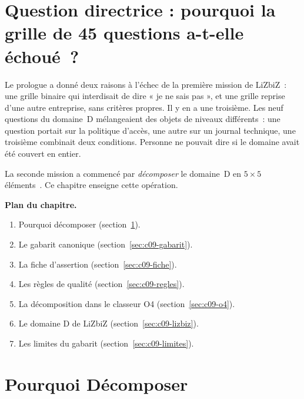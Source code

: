 \bigskip

\section*{Question directrice : pourquoi la grille de 45 questions a-t-elle échoué~?}

Le prologue a donné deux raisons à l'échec de la première mission de
LiZbiZ~: une grille binaire qui interdisait de dire « je ne sais pas », et
une grille reprise d'une autre entreprise, sans critères propres. Il y en a
une troisième. Les neuf questions du domaine~D mélangeaient des objets de
niveaux différents~: une question portait sur la politique d'accès, une
autre sur un journal technique, une troisième combinait deux conditions.
Personne ne pouvait dire si le domaine avait été couvert en entier.

La seconde mission a commencé par \emph{décomposer} le domaine~D en
$5 \times 5$ éléments~\cite{minka2026auditologie}. Ce chapitre enseigne
cette opération.

\medskip
\textbf{Plan du chapitre.}
\begin{enumerate}
    \item Pourquoi décomposer (section~\ref{sec:c09-pourquoi}).
    \item Le gabarit canonique (section~\ref{sec:c09-gabarit}).
    \item La fiche d'assertion (section~\ref{sec:c09-fiche}).
    \item Les règles de qualité (section~\ref{sec:c09-regles}).
    \item La décomposition dans le classeur O4
          (section~\ref{sec:c09-o4}).
    \item Le domaine D de LiZbiZ (section~\ref{sec:c09-lizbiz}).
    \item Les limites du gabarit (section~\ref{sec:c09-limites}).
\end{enumerate}

\separateur

\section{Pourquoi Décomposer}
\label{sec:c09-pourquoi}

